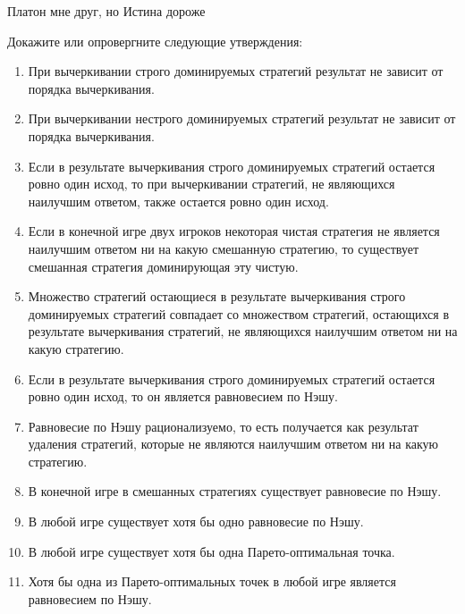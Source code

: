 \begin{problem}
 Платон мне друг, но Истина дороже\par
Докажите или опровергните следующие утверждения:\par
\begin{enumerate}
\item	При вычеркивании строго доминируемых стратегий результат не зависит от порядка вычеркивания.\par
\item 	При вычеркивании нестрого доминируемых стратегий результат не зависит от порядка вычеркивания.\par
\item 	Если в результате вычеркивания строго доминируемых стратегий остается ровно один исход, то при вычеркивании стратегий, не являющихся наилучшим ответом, также остается ровно один исход.\par
\item Если в конечной игре двух игроков некоторая чистая стратегия  не является наилучшим ответом ни на какую смешанную стратегию, то существует смешанная стратегия доминирующая эту чистую.\par
\item Множество стратегий остающиеся в результате вычеркивания строго доминируемых стратегий совпадает со множеством стратегий, остающихся в результате вычеркивания стратегий, не являющихся наилучшим ответом ни на какую стратегию.\par
\item Если в результате вычеркивания строго доминируемых стратегий остается ровно один исход, то он является равновесием по Нэшу.\par
\item Равновесие по Нэшу рационализуемо, то есть получается как результат удаления стратегий, которые не являются наилучшим ответом ни на какую стратегию. \par
\item В конечной игре в смешанных стратегиях существует равновесие по Нэшу.\par
\item В любой игре существует хотя бы одно равновесие по Нэшу.\par
\item В любой игре существует хотя бы одна Парето-оптимальная точка.\par
\item Хотя бы одна из Парето-оптимальных точек в любой игре является равновесием по Нэшу.
\end{enumerate}


\begin{sol}

\end{sol}
\end{problem}



